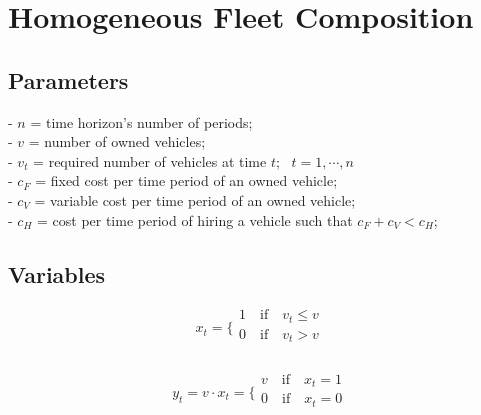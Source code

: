 \documentclass[a4paper,12pt,titlepage]{article}
\begin{document}
\section*{Homogeneous Fleet Composition}
\subsection*{Parameters}
\begin{flushleft}
- $n$ = time horizon's number of periods;\\
- $v$ = number of owned vehicles;\\
- $v_t$ = required number of vehicles at time $t$;\,\,\, $t=1,\cdots,n$\\
- $c_F$ = fixed cost per time period of an owned vehicle;\\
- $c_V$ = variable cost per time period of an owned vehicle;\\
- $c_H$ = cost per time period of hiring a vehicle such that $c_F+c_V<c_H$;
\end{flushleft}
\subsection*{Variables}
$$x_t=
\bigg \{
\begin{array}{ll}
1\quad \text{if}\quad v_t\leq v\\
0\quad \text{if}\quad v_t>v \\
\end{array}
$$
\\
$$y_t = v \cdot x_t =
\bigg \{
\begin{array}{ll}
v\quad \text{if}\quad x_t=1\\
0\quad \text{if}\quad x_t=0 \\
\end{array}
$$
\end{document}
